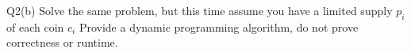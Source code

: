 \begin{problem}
  {Q2(b)}
  Solve the same problem, but this time assume you have a limited supply $p_i$ of each coin $c_i$
  Provide a dynamic programming algorithm, do not prove correctness or runtime.
\end{problem}

